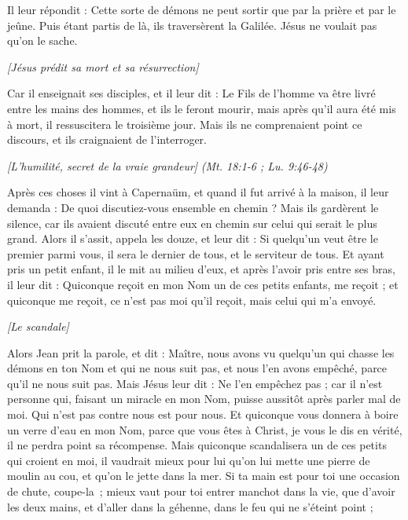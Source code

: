 \begin{multicols}{2}
Il leur répondit : Cette sorte de démons ne peut sortir que par la prière et par le jeûne.
Puis étant partis de là, ils traversèrent la Galilée. Jésus ne voulait pas qu’on le sache.
\begin{center}
\textit{[Jésus prédit sa mort et sa résurrection]}
\end{center}
\PPE{}
Car il enseignait ses disciples, et il leur dit : Le Fils de l'homme va être livré entre les mains des hommes, et ils le feront mourir, mais après qu'il aura été mis à mort, il ressuscitera le troisième jour.
Mais ils ne comprenaient point ce discours, et ils craignaient de l'interroger.
\begin{center}
\textit{[L'humilité, secret de la vraie grandeur]}
\textit{(Mt. 18:1-6 ; Lu. 9:46-48)}
\end{center}
\PPE{}
Après ces choses il vint à Capernaüm, et quand il fut arrivé à la maison, il leur demanda : De quoi discutiez-vous ensemble en chemin ?
Mais ils gardèrent le silence, car ils avaient discuté entre eux en chemin sur celui qui serait le plus grand.
Alors il s’assit, appela les douze, et leur dit : Si quelqu'un veut être le premier parmi vous, il sera le dernier de tous, et le serviteur de tous.
Et ayant pris un petit enfant, il le mit au milieu d'eux, et après l'avoir pris entre ses bras, il leur dit :
Quiconque reçoit en mon Nom un de ces petits enfants, me reçoit ; et quiconque me reçoit, ce n'est pas moi qu’il reçoit, mais celui qui m'a envoyé.
\begin{center}
\textit{[Le scandale]}
\end{center}
\PPE{}
Alors Jean prit la parole, et dit : Maître, nous avons vu quelqu'un qui chasse les démons en ton Nom et qui ne nous suit pas, et nous l'en avons empêché, parce qu'il ne nous suit pas.
Mais Jésus leur dit : Ne l'en empêchez pas ; car il n’est personne qui, faisant un miracle en mon Nom, puisse aussitôt après parler mal de moi.
Qui n'est pas contre nous est pour nous.
Et quiconque vous donnera à boire un verre d'eau en mon Nom, parce que vous êtes à Christ, je vous le dis en vérité, il ne perdra point sa récompense.
Mais quiconque scandalisera un de ces petits qui croient en moi, il vaudrait mieux pour lui qu'on lui mette une pierre de moulin au cou, et qu'on le jette dans la mer.
Si ta main est pour toi une occasion de chute, coupe-la ; mieux vaut pour toi entrer manchot dans la vie, que d'avoir les deux mains, et d’aller dans la géhenne, dans le feu qui ne s'éteint point ;

\end{multicols}
